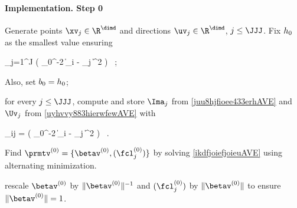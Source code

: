 \paragraph{Implementation. Step 0}
\begin{mylist}
\item
Generate points \( \xv_{j} \in \R^{\dimd} \) and directions \( \uv_{j} \in \R^{\dimd} \), \( j \leq \JJJ \).
Fix \( h_{0} \) as the smallest value ensuring
\begin{EQA}[c]
	\sum_{j=1}^{J} 
	\sumi \Kern\bigl( \hiso_{0}^{-2} \| \Xv_{i} - \xv_{j} \|^{2} \bigr)
	\geq 
	\nmin
	\, ;
\end{EQA}
Also, set \( b_{0} = h_{0} \);

\item 
for every \( j \leq \JJJ \), compute and store \( \Ima_{j} \) from \eqref{juu8hjfioee433erhAVE} and \( \Uv_{j} \) from \eqref{uyhvvy883hierwfewAVE}
with 
\begin{EQA}[c]
	\weight_{ij} = \Kern\bigl( \hiso_{0}^{-2} \| \Xv_{i} - \xv_{j} \|^{2} \bigr) 
	\, .
\end{EQA}
\item 
Find \( \prmtv^{(0)} = \{ \betav^{(0)},(\fcl_{j}^{(0)}) \} \) by solving \eqref{ikdfjoiefjoieuAVE} using alternating minimization.
\item 
rescale \( \betav^{(0)} \) by \( \| \betav^{(0)} \|^{-1} \) and \( (\fcl_{j}^{(0)}) \) by \( \| \betav^{(0)} \| \) to ensure 
\( \| \betav^{(0)} \| = 1 \).
\end{mylist}


